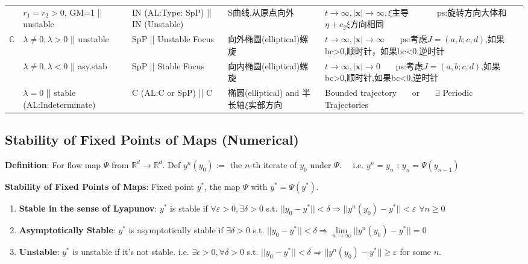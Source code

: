 \documentclass[9pt]{article}
\begin{document}
{\begin{longtable}{|c|l|l|l|l|l|}
    \cline{2-5}
    & { $r_1=r_2>0$, {\tiny GM=1} || {\tiny unstable}} &  IN {\tiny(AL:Type: SpP)} || { IN {\tiny (Unstable)}} & { S曲线,从原点向外} & { $t\to\infty,|\mathbf{x}|\to\infty,\xi$主导 \ \ \ \ \ \ ps:旋转方向大体和$\eta+c_2\xi$方向相同} & \\
    \cline{1-5}
    \multirow{3}{*}{$\mathbb{C}$} & { $\lambda\ne0,\lambda>0$ || unstable} &  SpP || Unstable Focus & { 向外椭圆(elliptical)螺旋} & { $t\to\infty,|\mathbf{x}|\to\infty$ \ \ \ {\tiny ps:考虑$J=(a,b;c,d)$,如果bc>0,顺时针，如果bc<0,逆时针}} & \\
    \cline{2-5}
    & { $\lambda\ne0,\lambda<0$ || asy.stab} &  SpP || Stable Focus & { 向内椭圆(elliptical)螺旋} & { $t\to\infty,|\mathbf{x}|\to0$ \ \ \ {\tiny ps:考虑$J=(a,b;c,d)$,如果bc>0,顺时针,如果bc<0,逆时针}} & \\
    \cline{2-5}
    & { $\lambda=0$ || stable {\tiny (AL:Indeterminate)}} &  C { (AL:C or SpP)} || C & { 椭圆(elliptical) and 半长轴$\xi$实部方向} & { Bounded trajectory \ \ \ or \ \ \ $\exists$ Periodic Trajectories} & \\
    \hline
\end{longtable}
\vspace{-0.4cm}
}


\subsection{Stability of Fixed Points of Maps (Numerical)}

\textbf{Definition}: For flow map $\Psi$ from $\mathbb{R}^d\to\mathbb{R}^d$. Def $y^{n}(y_0):=$ the $n$-th iterate of $y_0$ under $\Psi$. \ \ {\footnotesize i.e. $y^{n}=y_n$ ; $y_n=\Psi(y_{n-1})$}

\textbf{Stability of Fixed Points of Maps}: Fixed point $y^*$, the map $\Psi$ with $y^*=\Psi(y^*)$.
\begin{enumerate}[itemsep=-2pt, topsep=-2pt]
    \item \textbf{Stable in the sense of Lyapunov}: $y^*$ is stable if $\forall \varepsilon>0,\exists \delta>0$ s.t. $||y_0-y^*||<\delta\Rightarrow||y^{n}(y_0)-y^*||<\varepsilon$ $\forall n\geq0$
    \item \textbf{Asymptotically Stable}: $y^*$ is asymptotically stable if $\exists \delta>0$ s.t. $||y_0-y^*||<\delta\Rightarrow\lim\limits_{n\to\infty}||y^{n}(y_0)-y^*||=0$
    \item \textbf{Unstable}: $y^*$ is unstable if it's not stable. \quad i.e. $\exists \epsilon>0,\forall \delta>0$ s.t. $||y_0-y^*||<\delta\Rightarrow||y^{n}(y_0)-y^*||\geq\varepsilon$ for some $n$.
\end{enumerate}
\end{document}
